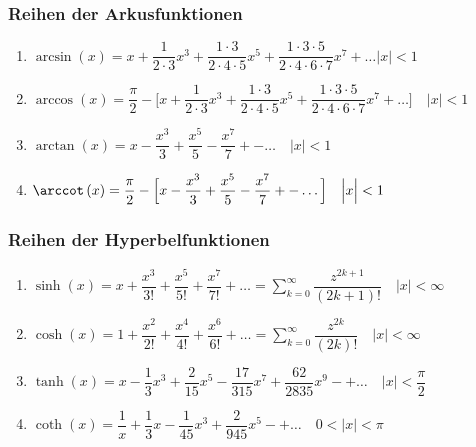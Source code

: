 \subsubsection{Reihen der Arkusfunktionen}
\begin{enumerate}[$(a)$]
\item $\arcsin\left(x\right)=x+\dfrac{1}{2\cdot 3}x^3+\dfrac{1\cdot 3}{2\cdot 4\cdot 5}x^5+\dfrac{1\cdot 3\cdot 5}{2\cdot 4\cdot 6\cdot 7}x^7+\dotso\Big\vert x\Big\vert<1$
\item $\arccos\left(x\right)=\dfrac{\pi}{2}-\Big[x+\dfrac{1}{2\cdot 3}x^3+\dfrac{1\cdot 3}{2\cdot 4\cdot 5}x^5+\dfrac{1\cdot 3\cdot 5}{2\cdot 4\cdot 6\cdot 7}x^7+\dotso\Big]\quad \Big\vert x\Big\vert<1$
\item $\arctan\left(x\right)=x-\dfrac{x^3}{3}+\dfrac{x^5}{5}-\dfrac{x^7}{7}+-\dotso\quad \Big\vert x\Big\vert<1$ 
\item $\arccot\left(x\right)=\dfrac{\pi}{2}-\Big[x-\dfrac{x^3}{3}+\dfrac{x^5}{5}-\dfrac{x^7}{7}+-\dotso\Big]\quad \Big\vert x\Big\vert<1$ 
\end{enumerate}
\subsubsection{Reihen der Hyperbelfunktionen}
\begin{enumerate}[$(a)$]
\item $\sinh\left(x\right)=x+\dfrac{x^3}{3!}+\dfrac{x^5}{5!}+\dfrac{x^7}{7!}+\dotso=\displaystyle \sum_{k=0}^{\infty}\dfrac{z^{2k+1}}{\left(2k+1\right)!}\quad \Big\vert x\Big\vert<\infty$
\item $\cosh\left(x\right)=1+\dfrac{x^2}{2!}+\dfrac{x^4}{4!}+\dfrac{x^6}{6!}+\dotso=\displaystyle \sum_{k=0}^{\infty}\dfrac{z^{2k}}{\left(2k\right)!}\quad \Big\vert x\Big\vert<\infty$
\item $\tanh\left(x\right)=x-\dfrac{1}{3}x^3+\dfrac{2}{15}x^5-\dfrac{17}{315}x^7+\dfrac{62}{2835}x^9-+\dotso\quad \Big\vert x\Big\vert<\dfrac{\pi}{2}$
\item $\coth\left(x\right)=\dfrac{1}{x}+\dfrac{1}{3}x-\dfrac{1}{45}x^3+\dfrac{2}{945}x^5-+\dotso\quad 0<\Big\vert x\Big\vert<\pi$
\end{enumerate}
